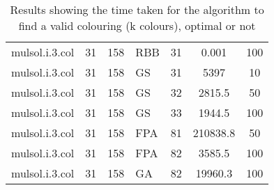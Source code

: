 \begin{table}[H]
\begin{tabular}{|l c c l c c c|}
mulsol.i.3.col & 31 & 158 & RBB & 31 & 0.001 & 100\\
mulsol.i.3.col & 31 & 158 & GS  & 31 & 5397 & 10\\
mulsol.i.3.col & 31 & 158 & GS  & 32 & 2815.5 & 50\\
mulsol.i.3.col & 31 & 158 & GS  & 33 & 1944.5 & 100\\
mulsol.i.3.col & 31 & 158 & FPA & 81 & 210838.8 & 50\\
mulsol.i.3.col & 31 & 158 & FPA & 82 & 3585.5 & 100\\
mulsol.i.3.col & 31 & 158 & GA  & 82 & 19960.3 & 100\\ \hline
\end{tabular}
\caption{Results showing the time taken for the algorithm to find a valid colouring (k colours), optimal or not}
\label{res:timeToK}
\end{table}

